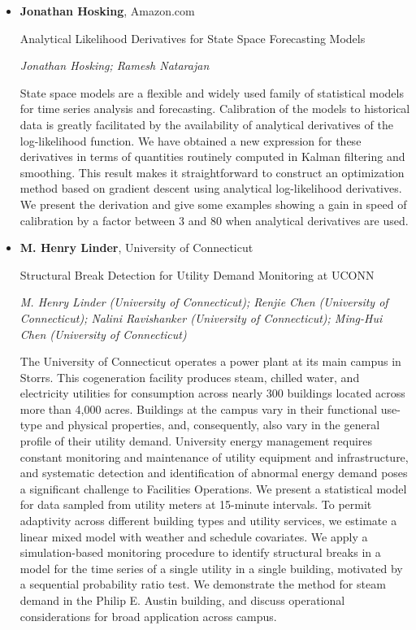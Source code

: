 \begin{itemize}
\item \textbf{Jonathan Hosking}, Amazon.com

Analytical Likelihood Derivatives for State Space Forecasting Models

\emph{\footnotesize Jonathan Hosking; Ramesh Natarajan}

State space models are a flexible and widely used family of statistical models for time series analysis and forecasting. Calibration of the models to historical data is greatly facilitated by the availability of analytical derivatives of the log-likelihood function. We have obtained a new expression for these derivatives in terms of quantities routinely computed in Kalman filtering and smoothing. This result makes it straightforward to construct an optimization method based on gradient descent using analytical log-likelihood derivatives. We present the derivation and give some examples showing a gain in speed of calibration by a factor between 3 and 80 when analytical derivatives are used.


\item \textbf{M. Henry Linder}, University of Connecticut

Structural Break Detection for Utility Demand Monitoring at UCONN

\emph{\footnotesize M. Henry Linder (University of Connecticut); Renjie Chen (University of Connecticut); Nalini Ravishanker (University of Connecticut); Ming-Hui Chen (University of Connecticut)}

The University of Connecticut operates a power plant at its main campus in Storrs. This cogeneration facility produces steam, chilled water, and electricity utilities for consumption across nearly 300 buildings located across more than 4,000 acres. Buildings at the campus vary in their functional use-type and physical properties, and, consequently, also vary in the general profile of their utility demand. University energy management requires constant monitoring and maintenance of utility equipment and infrastructure, and systematic detection and identification of abnormal energy demand poses a significant challenge to Facilities Operations. We present a statistical model for data sampled from utility meters at 15-minute intervals. To permit adaptivity across different building types and utility services, we estimate a linear mixed model with weather and schedule covariates. We apply a simulation-based monitoring procedure to identify structural breaks in a model for the time series of a single utility in a single building, motivated by a sequential probability ratio test. We demonstrate the method for steam demand in the Philip E. Austin building, and discuss operational considerations for broad application across campus.


\end{itemize}
